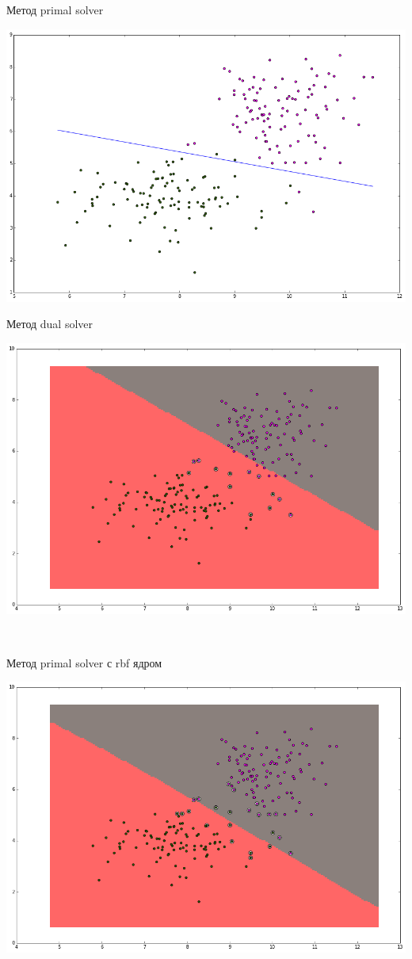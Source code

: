 \documentclass[12pt, a4paper]{article}
\begin{document}
			Метод primal solver
			\begin{center}
				\includegraphics[width=16cm]{7par_primal.png}
			\end{center}

			Метод dual solver
			\begin{center}
				\includegraphics[width=16cm]{7par_dual.png}
			\end{center}
			
			~\newline
			~\newline
			
			Метод primal solver с rbf ядром
			\begin{center}
				\includegraphics[width=16cm]{7par_dual_rbf.png}
			\end{center}
\end{document}
